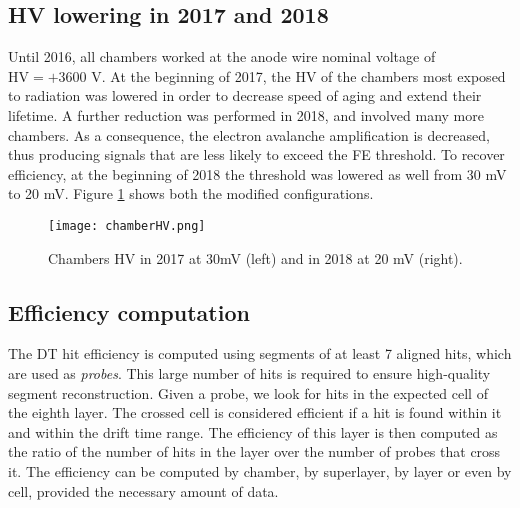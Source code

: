 \documentclass[12pt,twoside,a4paper]{report}
\numberwithin{equation}{section}
\begin{document}
\subsection{HV lowering in 2017 and 2018}
Until 2016, all chambers worked at the anode wire nominal voltage of $\mathrm{HV}= +3600$ V. At the beginning of 2017, the HV of the chambers most exposed to radiation was lowered in order to decrease speed of aging and extend their lifetime. A further reduction was performed in 2018, and involved many more chambers. As a consequence, the electron avalanche amplification is decreased, thus producing signals that are less likely to exceed the FE threshold. To recover efficiency, at the beginning of 2018 the threshold was lowered as well from 30 mV to 20 mV.
Figure \ref{fig:chamberHV} shows both the modified configurations.
\begin{figure}[!htb]
\texttt{[image: chamberHV.png]}
\caption{\label{fig:chamberHV} Chambers HV in 2017 at 30mV (left) and in 2018 at 20 mV (right). \cite{hit_eff}}
\end{figure}

\subsection{Efficiency computation}
The DT hit efficiency is computed using segments of at least 7 aligned hits, which are used as \textit{probes}. This large number of hits is required to ensure high-quality segment reconstruction. Given a probe, we look for hits in the expected cell of the eighth layer. The crossed cell is considered efficient if a hit is found within it and within the drift time range. The efficiency of this layer is then computed as the ratio of the number of hits in the layer over the number of probes that cross it.
The efficiency can be computed by chamber, by superlayer, by layer or even by cell, provided the necessary amount of data.
\end{document}
